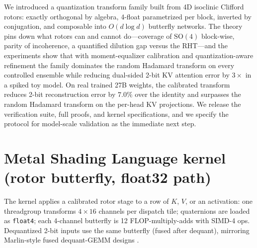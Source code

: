 \documentclass{article}
\newcommand{\SO}{\mathrm{SO}}
\begin{document}
We introduced a quantization transform family built from 4D isoclinic Clifford
rotors: exactly orthogonal by algebra, 4-float parametrized per block,
inverted by conjugation, and composable into $O(d\log d)$ butterfly networks.
The theory pins down what rotors can and cannot do---coverage of $\SO(4)$
block-wise, parity of incoherence, a quantified dilution gap versus the
RHT---and the experiments show that with moment-equalizer calibration and
quantization-aware refinement the family dominates the random Hadamard
transform on every controlled ensemble while reducing dual-sided 2-bit KV
attention error by $3\times$ in a spiked toy model. On real trained 27B
weights, the calibrated transform reduces 2-bit reconstruction error by
$7.0\%$ over the identity and surpasses the random Hadamard transform on the
per-head KV projections. We release the
verification suite, full proofs, and kernel specifications, and we specify the
protocol for model-scale validation as the immediate next step.




\appendix

\section{Metal Shading Language kernel (rotor butterfly, float32 path)}
\label{app:msl}

The kernel applies a calibrated rotor stage to a row of $K$, $V$, or an
activation: one threadgroup transforms $4\times16$ channels per dispatch
tile; quaternions are loaded as \texttt{float4}; each 4-channel butterfly is
12 FLOP-multiply-adds with SIMD-4 ops. Dequantized 2-bit inputs use the same
butterfly (fused after dequant), mirroring Marlin-style fused dequant-GEMM
designs \citep{frantar2024marlin}.
\end{document}
